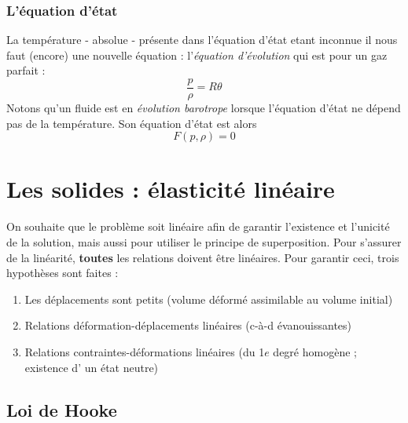         \subsubsection{L'équation d'état}
        La température - absolue - présente dans l'équation d'état etant inconnue il nous
        faut (encore) une nouvelle équation : l'\textit{équation d'évolution} qui est pour un gaz
        parfait :
        \begin{equation}
        \frac{p}{\rho} = R\theta
        \end{equation}
        Notons qu'un fluide est en \textit{évolution barotrope} lorsque l'équation d'état
        ne dépend pas de la température. Son équation d'état est alors
        \begin{equation}
        F(p,\rho) = 0
        \end{equation}
    
    
    
    
        
\section{Les solides : élasticité linéaire}
On souhaite que le problème soit linéaire afin de garantir l'existence et l'unicité de la
solution, mais aussi pour utiliser le principe de superposition. Pour s'assurer de la
linéarité, \textbf{toutes} les relations doivent être linéaires. Pour garantir ceci, trois
hypothèses sont faites :
\begin{enumerate}
\item Les déplacements sont petits (volume déformé assimilable au volume initial)
\item Relations déformation-déplacements linéaires (c-à-d évanouissantes)
\item Relations contraintes-déformations linéaires (du 1$e$ degré homogène ; existence d'
un état neutre)
\end{enumerate}

    \subsection{Loi de Hooke}

